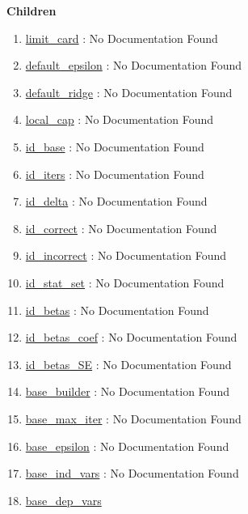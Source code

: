 \textbf{Children}
\begin{enumerate}
\item \hyperlink{ecldoc:logisticregression.constants.limit_card}{limit\_card}
: No Documentation Found
\item \hyperlink{ecldoc:logisticregression.constants.default_epsilon}{default\_epsilon}
: No Documentation Found
\item \hyperlink{ecldoc:logisticregression.constants.default_ridge}{default\_ridge}
: No Documentation Found
\item \hyperlink{ecldoc:logisticregression.constants.local_cap}{local\_cap}
: No Documentation Found
\item \hyperlink{ecldoc:logisticregression.constants.id_base}{id\_base}
: No Documentation Found
\item \hyperlink{ecldoc:logisticregression.constants.id_iters}{id\_iters}
: No Documentation Found
\item \hyperlink{ecldoc:logisticregression.constants.id_delta}{id\_delta}
: No Documentation Found
\item \hyperlink{ecldoc:logisticregression.constants.id_correct}{id\_correct}
: No Documentation Found
\item \hyperlink{ecldoc:logisticregression.constants.id_incorrect}{id\_incorrect}
: No Documentation Found
\item \hyperlink{ecldoc:logisticregression.constants.id_stat_set}{id\_stat\_set}
: No Documentation Found
\item \hyperlink{ecldoc:logisticregression.constants.id_betas}{id\_betas}
: No Documentation Found
\item \hyperlink{ecldoc:logisticregression.constants.id_betas_coef}{id\_betas\_coef}
: No Documentation Found
\item \hyperlink{ecldoc:logisticregression.constants.id_betas_se}{id\_betas\_SE}
: No Documentation Found
\item \hyperlink{ecldoc:logisticregression.constants.base_builder}{base\_builder}
: No Documentation Found
\item \hyperlink{ecldoc:logisticregression.constants.base_max_iter}{base\_max\_iter}
: No Documentation Found
\item \hyperlink{ecldoc:logisticregression.constants.base_epsilon}{base\_epsilon}
: No Documentation Found
\item \hyperlink{ecldoc:logisticregression.constants.base_ind_vars}{base\_ind\_vars}
: No Documentation Found
\item \hyperlink{ecldoc:logisticregression.constants.base_dep_vars}{base\_dep\_vars}

\end{enumerate}
